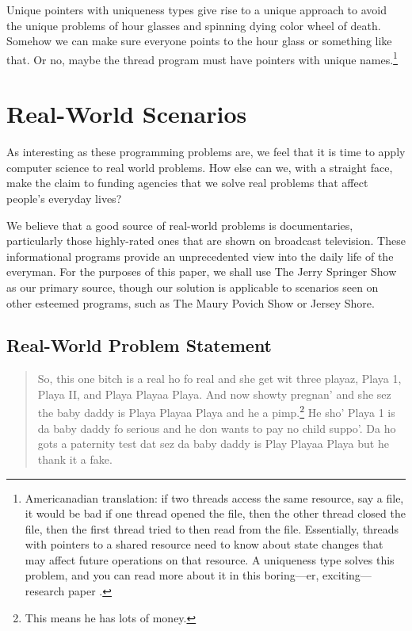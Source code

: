 \documentclass[10pt,twocolumn,letterpaper]{article}
\begin{document}
Unique pointers with uniqueness types give rise to a unique approach to avoid the unique problems of hour glasses and spinning dying color wheel of death. Somehow we can make sure everyone points to the hour glass or something like that. Or no, maybe the thread program must have pointers with unique names.\footnote{Americanadian translation: if two threads access the same resource, say a file, it would be bad if one thread opened the file, then the other thread closed the file, then the first thread tried to then read from the file. Essentially, threads with pointers to a shared resource need to know about state changes that may affect future operations on that resource. A uniqueness type solves this problem, and you can read more about it in this boring---er, exciting---research paper \cite{philipp}.}

\section{Real-World Scenarios}
As interesting as these programming problems are, we feel that it is time to apply computer science to real world problems. How else can we, with a straight face, make the claim to funding agencies that we solve real problems that affect people's everyday lives?

We believe that a good source of real-world problems is documentaries, particularly those highly-rated ones that are shown on broadcast television. These informational programs provide an unprecedented view into the daily life of the everyman. For the purposes of this paper, we shall use The Jerry Springer Show as our primary source, though our solution is applicable to scenarios seen on other esteemed  programs, such as The Maury Povich Show or Jersey Shore.

\subsection{Real-World Problem Statement}

\begin{quote}
So, this one bitch is a real ho fo real and she get wit three playaz, Playa 1, Playa II, and Playa Playaa Playa. And now showty pregnan' and she sez the baby daddy is Playa Playaa Playa and he a pimp.\footnote{This means he has lots of money.} He sho' Playa 1 is da baby daddy fo serious and he don wants to pay no child suppo'. Da ho gots a paternity test dat sez da baby daddy is Play Playaa Playa but he thank it a fake.
\end{quote}
\end{document}
